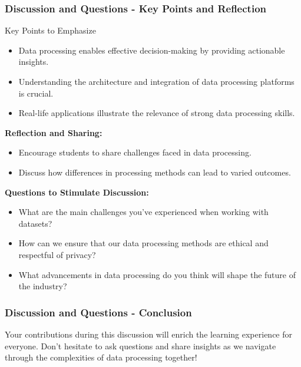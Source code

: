 \documentclass[aspectratio=169]{beamer}
\begin{document}
\begin{frame}[fragile]
  \frametitle{Discussion and Questions - Key Points and Reflection}
  \begin{block}{Key Points to Emphasize}
    \begin{itemize}
      \item Data processing enables effective decision-making by providing actionable insights.
      \item Understanding the architecture and integration of data processing platforms is crucial.
      \item Real-life applications illustrate the relevance of strong data processing skills.
    \end{itemize}
  \end{block}
  
  \textbf{Reflection and Sharing:}
  \begin{itemize}
    \item Encourage students to share challenges faced in data processing.
    \item Discuss how differences in processing methods can lead to varied outcomes.
  \end{itemize}
  
  \textbf{Questions to Stimulate Discussion:}
  \begin{itemize}
    \item What are the main challenges you've experienced when working with datasets?
    \item How can we ensure that our data processing methods are ethical and respectful of privacy?
    \item What advancements in data processing do you think will shape the future of the industry?
  \end{itemize}
\end{frame}

\begin{frame}[fragile]
  \frametitle{Discussion and Questions - Conclusion}
  Your contributions during this discussion will enrich the learning experience for everyone. 
  Don’t hesitate to ask questions and share insights as we navigate through the complexities of data processing together!
\end{frame}
\end{document}
